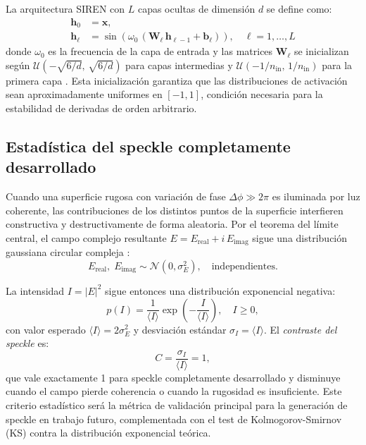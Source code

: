 La arquitectura SIREN con $L$ capas ocultas de dimensión $d$ se define como:
%
\begin{equation}
\label{eq:siren}
\begin{aligned}
  \mathbf{h}_0 &= \mathbf{x}, \\
  \mathbf{h}_\ell &= \sin\!\left(\omega_0\,(\mathbf{W}_\ell\,\mathbf{h}_{\ell-1} + \mathbf{b}_\ell)\right),
  \quad \ell = 1, \ldots, L
\end{aligned}
\end{equation}
%
donde $\omega_0$ es la frecuencia de la capa de entrada y las matrices $\mathbf{W}_\ell$
se inicializan según $\mathcal{U}(-\sqrt{6/d},\,\sqrt{6/d})$ para capas intermedias
y $\mathcal{U}(-1/n_{\mathrm{in}},\,1/n_{\mathrm{in}})$ para la primera capa
\cite{Sitzmann2020_SIREN}.
Esta inicialización garantiza que las distribuciones de activación sean aproximadamente
uniformes en $[-1, 1]$, condición necesaria para la estabilidad de derivadas de orden
arbitrario.

\subsection{Estadística del speckle completamente desarrollado}
\label{subsec:speckle}

Cuando una superficie rugosa con variación de fase $\Delta\phi \gg 2\pi$ es iluminada
por luz coherente, las contribuciones de los distintos puntos de la superficie interfieren
constructiva y destructivamente de forma aleatoria.
Por el teorema del límite central, el campo complejo resultante
$E = E_{\mathrm{real}} + i\,E_{\mathrm{imag}}$ sigue una distribución gaussiana circular
compleja \cite{Goodman2007_Speckle}:
%
\begin{equation}
  E_{\mathrm{real}},\; E_{\mathrm{imag}} \sim \mathcal{N}(0, \sigma_E^2),
  \quad \text{independientes.}
  \label{eq:campo_gaussiano}
\end{equation}

La intensidad $I = |E|^2$ sigue entonces una distribución exponencial negativa:
%
\begin{equation}
  p(I) = \frac{1}{\langle I \rangle}\exp\!\left(-\frac{I}{\langle I \rangle}\right),
  \quad I \geq 0,
  \label{eq:pdf_intensidad}
\end{equation}
%
con valor esperado $\langle I \rangle = 2\sigma_E^2$ y desviación estándar
$\sigma_I = \langle I \rangle$.
El \textit{contraste del speckle} es:
%
\begin{equation}
  C = \frac{\sigma_I}{\langle I \rangle} = 1,
  \label{eq:contraste}
\end{equation}
%
que vale exactamente 1 para speckle completamente desarrollado y disminuye
cuando el campo pierde coherencia o cuando la rugosidad es insuficiente.
Este criterio estadístico será la métrica de validación principal para la
generación de speckle en trabajo futuro, complementada con el test de
Kolmogorov-Smirnov (KS) contra la distribución exponencial teórica.
